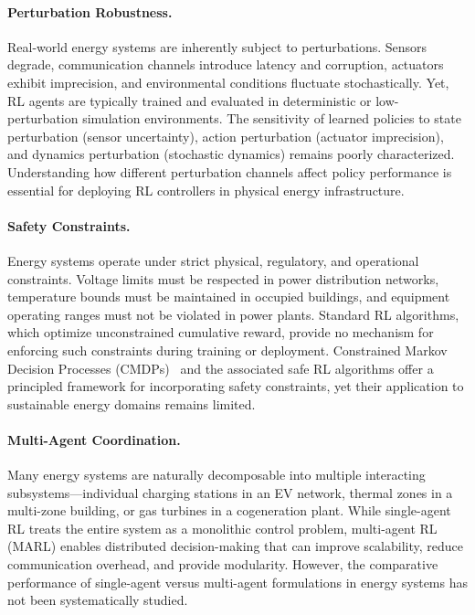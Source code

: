 \paragraph{Perturbation Robustness.} Real-world energy systems are inherently subject to perturbations. Sensors degrade, communication channels introduce latency and corruption, actuators exhibit imprecision, and environmental conditions fluctuate stochastically. Yet, RL agents are typically trained and evaluated in deterministic or low-perturbation simulation environments. The sensitivity of learned policies to state perturbation (sensor uncertainty), action perturbation (actuator imprecision), and dynamics perturbation (stochastic dynamics) remains poorly characterized. Understanding how different perturbation channels affect policy performance is essential for deploying RL controllers in physical energy infrastructure.

\paragraph{Safety Constraints.} Energy systems operate under strict physical, regulatory, and operational constraints. Voltage limits must be respected in power distribution networks, temperature bounds must be maintained in occupied buildings, and equipment operating ranges must not be violated in power plants. Standard RL algorithms, which optimize unconstrained cumulative reward, provide no mechanism for enforcing such constraints during training or deployment. Constrained Markov Decision Processes (CMDPs)~\citep{altman1999constrained} and the associated safe RL algorithms offer a principled framework for incorporating safety constraints, yet their application to sustainable energy domains remains limited.

\paragraph{Multi-Agent Coordination.} Many energy systems are naturally decomposable into multiple interacting subsystems---individual charging stations in an EV network, thermal zones in a multi-zone building, or gas turbines in a cogeneration plant. While single-agent RL treats the entire system as a monolithic control problem, multi-agent RL (MARL) enables distributed decision-making that can improve scalability, reduce communication overhead, and provide modularity. However, the comparative performance of single-agent versus multi-agent formulations in energy systems has not been systematically studied.

